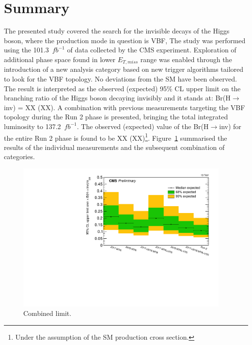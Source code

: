 \newpage
\section{Summary}
\hspace{10pt} The presented study covered the search for the invisible decays of the Higgs boson, where the production mode in question is VBF, The study was performed using the 101.3~$fb^{-1}$ of data collected by the CMS experiment. Exploration of additional phase space found in lower $E_{T,miss}$ range was enabled through the introduction of a new analysis category based on new trigger algorithms tailored to look for the VBF topology. No deviations from the SM have been observed. The result is interpreted as the observed (expected) 95\% CL upper limit on the branching ratio of the Higgs boson decaying invisibly and it stands at: Br(H$\rightarrow$inv) = XX (XX). A combination with previous measurements targeting the VBF topology during the Run 2 phase is presented, bringing the total integrated luminosity to 137.2~$fb^{-1}$. The observed (expected) value of the Br(H$\rightarrow$inv) for the entire Run 2 phase is found to be XX (XX)\footnote{Under the assumption of the SM production cross section.}. Figure~\ref{fig:combined_limit} summarised the results of the individual measurements and the subsequent combination of categories.

\begin{figure}[htbp]
  \centering
    \includegraphics[width= 0.95\textwidth]{Results/limit.pdf}
  \caption{Combined limit.}
  \label{fig:combined_limit}
\end{figure}